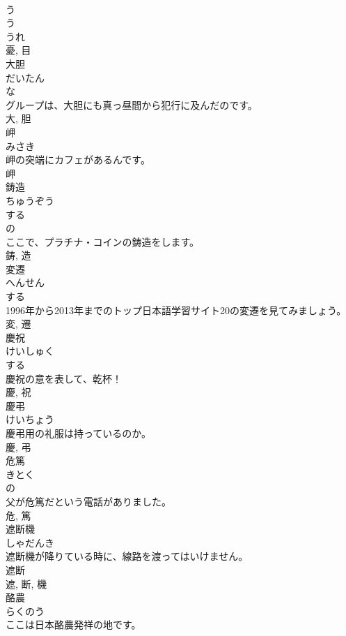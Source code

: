 \documentclass[8pt]{extreport}
\begin{document}
\begin{CJK}{UTF8}{min}
\\	う 
\\	う 
\\	うれ 
\\	憂, 目	
\\	大胆	
\\	だいたん	
\\	な 
\\	グループは、大胆にも真っ昼間から犯行に及んだのです。	
\\	大, 胆	
\\	岬	
\\	みさき	
\\	岬の突端にカフェがあるんです。	
\\	岬	
\\	鋳造	
\\	ちゅうぞう	
\\	する 
\\	の 
\\	ここで、プラチナ・コインの鋳造をします。	
\\	鋳, 造	
\\	変遷	
\\	へんせん	
\\	する 
\\	1996年から2013年までのトップ日本語学習サイト20の変遷を見てみましょう。	
\\	変, 遷	
\\	慶祝	
\\	けいしゅく	
\\	する 
\\	慶祝の意を表して、乾杯！	
\\	慶, 祝	
\\	慶弔	
\\	けいちょう	
\\	慶弔用の礼服は持っているのか。	
\\	慶, 弔	
\\	危篤	
\\	きとく	
\\	の 
\\	父が危篤だという電話がありました。	
\\	危, 篤	
\\	遮断機	
\\	しゃだんき	
\\	遮断機が降りている時に、線路を渡ってはいけません。	
\\	遮断 
\\	遮, 断, 機	
\\	酪農	
\\	らくのう	
\\	ここは日本酪農発祥の地です。	

\end{CJK}
\end{document}
